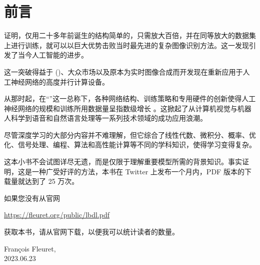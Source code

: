 \documentclass[oneside,11pt]{memoir}
\begin{document}
\newpage


{
\everymath{\color{black}}
\tableofcontents %
}

\clearpage

\listoffigures*
{}


\chapter*{前言}

\cite{nips-1502.c399862d3b9d6b76c8436e924a68c45b} 证明，仅用二十多年前\citep{lecun-89e}诞生的结构简单的，只需放大百倍，并在同等放大的数据集上进行训练，就可以以巨大优势击败当时最先进的复杂图像识别方法。这一发现引发了当今人工智能的进步。

这一突破得益于 ()、大众市场以及原本为实时图像合成而开发现在重新应用于人工神经网络的高度并行计算设备。

从那时起，在``''这一总称下，各种网络结构、训练策略和专用硬件的创新使得人工神经网络的规模和训练所用数据量呈指数级增长 \cite{arxiv-2202.05924}。这掀起了从计算机视觉与机器人科学到语音和自然语言处理等一系列技术领域的成功应用浪潮。

尽管深度学习的大部分内容并不难理解，但它综合了线性代数、微积分、概率、优化、信号处理、编程、算法和高性能计算等不同的学科知识，使得学习变得复杂。

这本小书不会试图详尽无遗，而是仅限于理解重要模型所需的背景知识。事实证明，这是一种广受好评的方法，本书在 Twitter 上发布一个月内，PDF 版本的下载量就达到了 25 万次。

如果您没有从官网 
\begin{center}
\href{https://fleuret.org/public/lbdl.pdf}{https://fleuret.org/public/lbdl.pdf}
\end{center}
获取本书，请从官网下载，以便我可以统计读者的数量。

\begin{flushright}
  François Fleuret,\\
  2023.06.23
\end{flushright}
\end{document}
